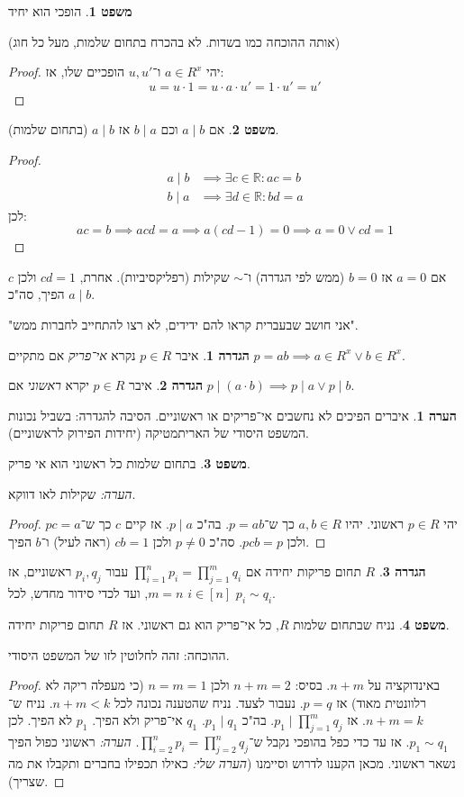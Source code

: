 \documentclass[a4paper]{article}
\newcommand\R     {\mathbb{R}}
\newcommand\co        {\colon}
\theoremstyle{definition}
\newtheorem{Theorem}{\color{myblue}משפט}
\newtheorem{Definition}{\color{mygreen}הגדרה}
\newtheorem{Remark}{\color{mycyan}הערה}
\newcommand\theo  [1] {\begin{Theorem}#1\end{Theorem}}
\newcommand\defi  [1] {\begin{Definition}#1\end{Definition}}
\newcommand\rmark [1] {\begin{Remark}#1\end{Remark}}
\begin{document}
	
	\theo{הופכי הוא יחיד} (אותה ההוכחה כמו בשדות. לא בהכרח בתחום שלמות, מעל כל חוג)\begin{proof}
		יהי $a \in R^x$ ו־$u, u'$ הופכיים שלו, אז:
		\[ u = u \cdot 1 = u \cdot a \cdot u' = 1 \cdot u' = u' \]
	\end{proof}
	\theo{אם $a \mid b$ וכם $b \mid a$ אז $a \mid b$ (בתחום שלמות). }\begin{proof}
		\begin{align*}
			a \mid b &\implies \exists c \in \R \co ac = b \\
			b \mid a &\implies \exists d \in \R\co bd = a
		\end{align*}
		לכן: 
		\[ ac = b \implies acd = a \implies a(cd - 1) = 0 \implies a = 0 \lor cd = 1 \]
	\end{proof}
	אם $a = 0$ אז $b = 0$ (ממש לפי הגדרה) ו־$\sim$ שקילות (רפליקסיביות). אחרת, $cd = 1$ ולכן $c$ הפיך, סה"כ $a \mid b$. 
	
	"אני חושב שבעברית קראו להם ידידים, לא רצו להתחייב לחברות ממש". 
	
	
	\defi{איבר $p \in R$ נקרא \textit{אי־פריק} אם מתקיים $p = ab \implies a \in R^x \lor b \in R^x$. }
	
	\defi{איבר $p \in R$ יקרא \textit{ראשוני} אם $p \mid (a \cdot b) \implies p \mid a \lor p \mid b$. }
	\rmark{איברים הפיכים לא נחשבים אי־פריקים או ראשוניים. הסיבה להגדרה: בשביל נכונות המשפט היסודי של האריתמטיקה (יחידות הפירוק לראשוניים). }
	
	\theo{בתחום שלמות כל ראשוני הוא אי פריק. }
	\textit{הערה: }שקילות לאו דווקא. 
	\begin{proof}
		יהי $p \in R$ ראשוני. יהיו $a, b \in R$ כך ש־$p = ab$. בה"כ $p \mid a$. אז קיים $c$ כך ש־$pc = a$ ולכן $pcb = p$. סה"כ $p \neq 0$ ולכן $cb = 1$ (ראה לעיל) ו־$b$ הפיך. 
	\end{proof}
	\defi{$R$ תחום פריקות יחידה אם $\prod_{i = 1}^{n}p_i = \prod_{j = 1}^{m}q_i$ עבור $p_i, q_j$ ראשוניים, אז $m = n$, ועד לכדי סידור מחדש, לכל $i \in [n]$ $p_i \sim q_i$. }
	\theo{נניח שבתחום שלמות $R$, כל אי־פריק הוא גם ראשוני. אז $R$ תחום פריקות יחידה. }
	
	ההוכחה: זהה לחלוטין לזו של המשפט היסודי. \begin{proof}
		באינדוקציה על $n+m$. בסיס: $n + m = 2$ ולכן $n = m = 1$ (כי מעפלה ריקה לא רלוונטית מאוד) אז $p = q$. נעבור לצעד. נניח שהטענה נכונה לכל $n + m < k$. נניח ש־$n + m = k$. אז $p_1 \mid \prod_{j = 1}^{m}q_j$. בה"כ $p_1 \mid q_1$. $q_1$ אי־פריק ולא הפיך. $p_1$ לא הפיך. לכן $p_1 \sim q_1$. אז עד כדי כפל בהופכי נקבל ש־$\prod_{i = 2}^{n} p_i = \prod_{j = 2}^{n} q_j$. \textit{הערה: }ראשוני כפול הפיך נשאר ראשוני. מכאן הקענו לדרוש וסיימנו (\textit{הערה שלי: }כאילו תכפילו בחברים ותקבלו את מה שצריך). 
	\end{proof}
	
\end{document}
